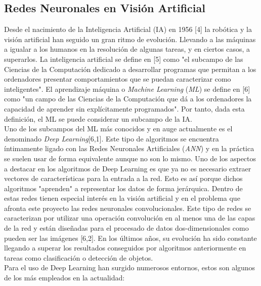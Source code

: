 \documentclass{bmvc2k}
\begin{document}
\subsection{Redes Neuronales en Visión Artificial}
Desde el nacimiento de la Inteligencia Artificial (IA) en 1956 [4] la robótica y la visión artificial han seguido un gran ritmo de evolución. Llevando a las máquinas a igualar a los humanos en la resolución de algunas tareas, y en ciertos casos, a superarlos.
La inteligencia artificial se define en [5] como "el subcampo de las Ciencias de la Computación dedicado a desarrollar programas que permitan a los ordenadores presentar comportamientos que se puedan caracterizar como inteligentes". El aprendizaje máquina o \textit{Machine Learning} (\textit{ML}) se define en [6] como "un campo de las Ciencias de la Computación que dá a los ordenadores la capacidad de aprender sin explícitamente programados". Por tanto, dada esta definición, el ML se puede considerar un subcampo de la IA.\\
Uno de los subcampos del ML más conocidos y en auge actualmente es el denominado \textit{Deep Learning}[6,1]. Este tipo de algoritmos se encuentra íntimamente ligado con las Redes Neuronales Artificiales (\textit{ANN}) y en la práctica se suelen usar de forma equivalente aunque no son lo mismo. Uno de los aspectos a destacar en los algoritmos de Deep Learning es que ya no es necesario extraer vectores de características para la entrada a la red. Esto es así porque dichos algoritmos "aprenden" a representar los datos de forma jerárquica. Dentro de estas redes tienen especial interés en la visión artificial y en el problema que afronta este proyecto las redes neuronales convolucionales. Este tipo de redes se caracterizan por utilizar una operación convolución en al menos una de las capas de la red y están diseñadas para el procesado de datos dos-dimensionales como pueden ser las imágenes [6,2]. En los últimos años, su evolución ha sido constante llegando a superar los resultados conseguidos por algoritmos anteriormente en tareas como clasificación o detección de objetos.\\
Para el uso de Deep Learning han surgido numerosos entornos, estos son algunos de los más empleados en la actualidad:
\end{document}
